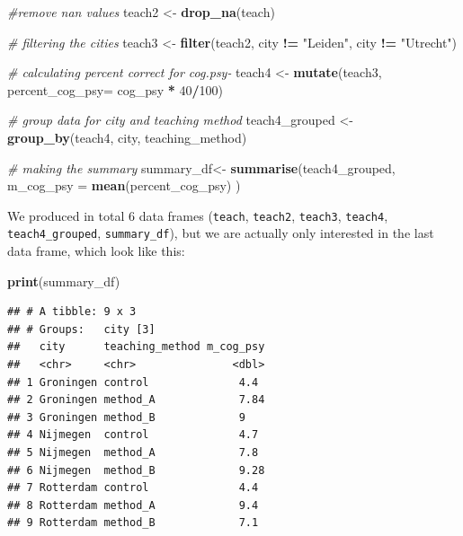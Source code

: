 \documentclass[
]{scrartcl}
\newenvironment{Shaded}{\begin{snugshade}}{\end{snugshade}}
\newcommand{\AttributeTok}[1]{\textcolor[rgb]{0.13,0.29,0.53}{#1}}
\newcommand{\CommentTok}[1]{\textcolor[rgb]{0.56,0.35,0.01}{\textit{#1}}}
\newcommand{\DecValTok}[1]{\textcolor[rgb]{0.00,0.00,0.81}{#1}}
\newcommand{\FunctionTok}[1]{\textcolor[rgb]{0.13,0.29,0.53}{\textbf{#1}}}
\newcommand{\NormalTok}[1]{#1}
\newcommand{\OtherTok}[1]{\textcolor[rgb]{0.56,0.35,0.01}{#1}}
\newcommand{\SpecialCharTok}[1]{\textcolor[rgb]{0.81,0.36,0.00}{\textbf{#1}}}
\newcommand{\StringTok}[1]{\textcolor[rgb]{0.31,0.60,0.02}{#1}}
\begin{document}
\begin{Shaded}
\begin{Highlighting}[]
\CommentTok{\#remove nan values}
\NormalTok{teach2 }\OtherTok{\textless{}{-}} \FunctionTok{drop\_na}\NormalTok{(teach)}

\CommentTok{\# filtering the cities}
\NormalTok{teach3 }\OtherTok{\textless{}{-}} \FunctionTok{filter}\NormalTok{(teach2, city }\SpecialCharTok{!=} \StringTok{"Leiden"}\NormalTok{, city }\SpecialCharTok{!=} \StringTok{"Utrecht"}\NormalTok{)}

\CommentTok{\# calculating percent correct for cog.psy{-}}
\NormalTok{teach4 }\OtherTok{\textless{}{-}} \FunctionTok{mutate}\NormalTok{(teach3, }\AttributeTok{percent\_cog\_psy=}\NormalTok{ cog\_psy }\SpecialCharTok{*} \DecValTok{40}\SpecialCharTok{/}\DecValTok{100}\NormalTok{)}

\CommentTok{\# group data for city and teaching method}
\NormalTok{teach4\_grouped }\OtherTok{\textless{}{-}} \FunctionTok{group\_by}\NormalTok{(teach4, city, teaching\_method)}

\CommentTok{\# making the summary}
\NormalTok{summary\_df}\OtherTok{\textless{}{-}} \FunctionTok{summarise}\NormalTok{(teach4\_grouped,}
                        \AttributeTok{m\_cog\_psy =} \FunctionTok{mean}\NormalTok{(percent\_cog\_psy) )}
\end{Highlighting}
\end{Shaded}

We produced in total 6 data frames (\texttt{teach}, \texttt{teach2}, \texttt{teach3}, \texttt{teach4}, \texttt{teach4\_grouped}, \texttt{summary\_df}), but we are actually only interested in the last data frame, which look like this:

\begin{Shaded}
\begin{Highlighting}[]
\FunctionTok{print}\NormalTok{(summary\_df)}
\end{Highlighting}
\end{Shaded}

\begin{verbatim}
## # A tibble: 9 x 3
## # Groups:   city [3]
##   city      teaching_method m_cog_psy
##   <chr>     <chr>               <dbl>
## 1 Groningen control              4.4 
## 2 Groningen method_A             7.84
## 3 Groningen method_B             9   
## 4 Nijmegen  control              4.7 
## 5 Nijmegen  method_A             7.8 
## 6 Nijmegen  method_B             9.28
## 7 Rotterdam control              4.4 
## 8 Rotterdam method_A             9.4 
## 9 Rotterdam method_B             7.1
\end{verbatim}
\end{document}
